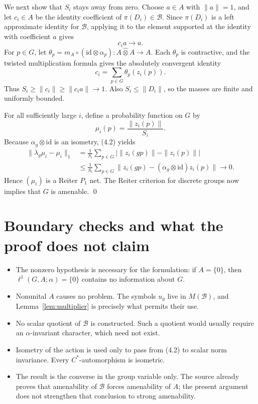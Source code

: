 \documentclass[11pt]{article}
\newcommand{\whot}{\widehat{\otimes}}
\newcommand{\ellone}{\ell^{1}}
\newcommand{\B}{\mathcal B}
\newcommand{\id}{\mathrm{id}}
\begin{document}
We next show that \(S_i\) stays away from zero.  Choose \(a\in A\) with
\(\|a\|=1\), and let \(c_i\in A\) be the identity coefficient of
\(\pi(D_i)\in\B\).  Since \(\pi(D_i)\) is a left approximate identity for
\(\B\), applying it to the element supported at the identity with
coefficient \(a\) gives
\[
 c_i a\longrightarrow a.                              \tag{4.3}
\]
For \(p\in G\), let
\(\theta_p=m_A\circ(\id\otimes\alpha_p):A\whot A\to A\).
Each \(\theta_p\) is contractive, and the twisted multiplication formula
gives the absolutely convergent identity
\[
 c_i=\sum_{p\in G}\theta_p(z_i(p)).                    \tag{4.4}
\]
Thus \(S_i\ge\|c_i\|\ge\|c_i a\|\to1\).  Also
\(S_i\le\|D_i\|\), so the masses are finite and uniformly bounded.

For all sufficiently large \(i\), define a probability function on \(G\) by
\[
 \mu_i(p)=\frac{\|z_i(p)\|}{S_i}.
\]
Because \(\alpha_g\otimes\id\) is an isometry, (4.2) yields
\begin{align*}
 \|\lambda_g\mu_i-\mu_i\|_1
 &=\frac1{S_i}\sum_{p\in G}
       \bigl|\|z_i(gp)\|-\|z_i(p)\|\bigr|\\
 &\le\frac1{S_i}\sum_{p\in G}
       \bigl\|z_i(gp)-(\alpha_g\otimes\id)z_i(p)\bigr\|
 \longrightarrow0.
\end{align*}
Hence \((\mu_i)\) is a Reiter \(P_1\) net.  The Reiter criterion for
discrete groups now implies that \(G\) is amenable.
\qed

\section{Boundary checks and what the proof does not claim}

\begin{itemize}
\item The nonzero hypothesis is necessary for the formulation: if
\(A=\{0\}\), then \(\ellone(G,A;\alpha)=\{0\}\) contains no information
about \(G\).
\item Nonunital \(A\) causes no problem.  The symbols \(u_g\) live in
\(M(\B)\), and Lemma~\ref{lem:multiplier} is precisely what permits their
use.
\item No scalar quotient of \(\B\) is constructed.  Such a quotient would
usually require an \(\alpha\)-invariant character, which need not exist.
\item Isometry of the action is used only to pass from (4.2) to scalar norm
invariance.  Every \(C^*\)-automorphism is isometric.
\item The result is the converse in the group variable only.  The source
already proves that amenability of \(\B\) forces amenability of \(A\); the
present argument does not strengthen that conclusion to strong
amenability.
\end{itemize}
\end{document}
